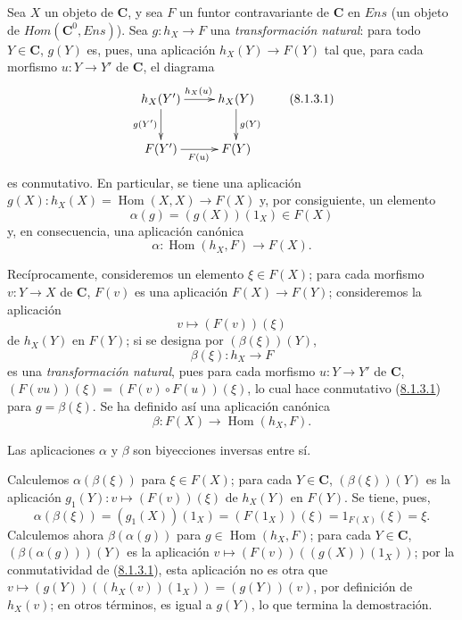 \begin{env}[8.1.3]
\label{0.8.1.3}
\label{0.8.1.3-fr}
Sea $X$ un objeto de $\boldsymbol{C}$, y sea $F$ un funtor contravariante de $\boldsymbol{C}$ en $\boldsymbol{\mathit{Ens}}$
(un objeto de $\boldsymbol{\mathit{Hom}}(\boldsymbol{C}^0,\boldsymbol{\mathit{Ens}})$). Sea $g:h_X\to F$ una \emph{transformación natural}: para todo $Y\in\boldsymbol{C}$,
$g(Y)$ es, pues, una aplicación $h_X(Y)\to F(Y)$ tal que, para cada morfismo $u:Y\to Y'$ de $\boldsymbol{C}$,
el diagrama
\[
  \xymatrix{
    h_X(Y')\ar[r]^{h_X(u)}\ar[d]_{g(Y')} &
    h_X(Y)\ar[d]^{g(Y)}\\
    F(Y')\ar[r]_{F(u)} & F(Y)
  }
  \tag{8.1.3.1}\label{0.8.1.3.1-fr}
\]
es conmutativo. En particular, se tiene una aplicación $g(X):h_X(X)=\operatorname{Hom}(X,X)\to F(X)$ y, por consiguiente, un elemento
\[
  \alpha(g)=(g(X))(1_X)\in F(X)
  \tag{8.1.3.2}
\]
y, en consecuencia, una aplicación canónica
\[
  \alpha:\operatorname{Hom}(h_X,F)\to F(X).
  \tag{8.1.3.3}
\]

Recíprocamente, consideremos un elemento $\xi\in F(X)$; para cada morfismo $v:Y\to X$ de $\boldsymbol{C}$, $F(v)$ es una
aplicación $F(X)\to F(Y)$; consideremos la aplicación
\[
  v\mapsto(F(v))(\xi)
  \tag{8.1.3.4}
\]
de $h_X(Y)$ en $F(Y)$; si se designa por $(\beta(\xi))(Y)$,
\[
  \beta(\xi):h_X\to F
  \tag{8.1.3.5}
\]
es una \emph{transformación natural}, pues para cada morfismo $u:Y\to Y'$ de $\boldsymbol{C}$,
$(F(vu))(\xi)=(F(v)\circ F(u))(\xi)$, lo cual hace conmutativo (\hyperref[0.8.1.3.1]{8.1.3.1}) para $g=\beta(\xi)$.
Se ha definido así una aplicación canónica
\[
  \beta:F(X)\to\operatorname{Hom}(h_X,F).
  \tag{8.1.3.6}
\]
\end{env}

\begin{proposition}[8.1.4]
\label{0.8.1.4}
\label{0.8.1.4-fr}
Las aplicaciones $\alpha$ y $\beta$ son biyecciones inversas entre sí.
\end{proposition}


Calculemos $\alpha(\beta(\xi))$ para $\xi\in F(X)$; para cada $Y\in\boldsymbol{C}$, $(\beta(\xi))(Y)$ es la aplicación
$g_1(Y):v\mapsto(F(v))(\xi)$ de $h_X(Y)$ en $F(Y)$. Se tiene, pues,
\[
  \alpha(\beta(\xi))=(g_1(X))(1_X)=(F(1_X))(\xi)
  =1_{F(X)}(\xi)=\xi.
\]
Calculemos ahora $\beta(\alpha(g))$ para $g\in\operatorname{Hom}(h_X,F)$; para cada $Y\in\boldsymbol{C}$, $(\beta(\alpha(g)))(Y)$
es la aplicación $v\mapsto(F(v))((g(X))(1_X))$; por la conmutatividad de (\hyperref[0.8.1.3.1]{8.1.3.1}), esta aplicación
no es otra que $v\mapsto(g(Y))((h_X(v))(1_X))=(g(Y))(v)$, por definición de $h_X(v)$; en otros términos,
es igual a $g(Y)$, lo que termina la demostración.


